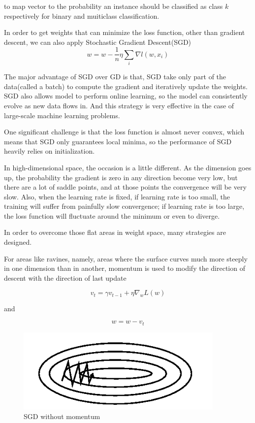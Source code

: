 \documentclass[10pt,twocolumn,letterpaper]{article}
\begin{document}
	to map vector to the probability an instance should be classified as class $k$ respectively for binary and muiticlass classification.
	
	In order to get weights that can minimize the loss function, other than gradient descent, we can also apply Stochastic Gradient Descent(SGD) 
	\[w = w - \frac{1}{n}\eta \sum_i \nabla l(w, x_i)\]
	
	The major advantage of SGD over GD is that, SGD take only part of the data(called a batch) to compute the gradient and iteratively update the weights. SGD also allows model to perform online learning, so the model can consistently evolve as new data flows in.\cite{alpaydin2004introduction} And this strategy is very effective in the case of large-scale machine learning problems\cite{bottou-bousquet-2008}.
	
	One significant challenge is that the loss function is almost never convex\cite{NIPS2016_6112}, which means that SGD only guarantees local minima, so the performance of SGD heavily relies on initialization.
	
	In high-dimensional space, the occasion is a little different. As the dimension goes up, the probability the gradient is zero in any direction become very low, but there are a lot of saddle points\cite{NIPS2016_6112}, and at those points the convergence will be very slow. Also, when the learning rate is fixed, if learning rate is too small, the training will suffer from painfully slow convergence; if learning rate is too large, the loss function will fluctuate around the minimum or even to diverge\cite{ruder_2017}.
	
	In order to overcome those flat areas in weight space, many strategies are designed.
	
	For areas like ravines, namely, areas where the surface curves much more steeply in one dimension than in another\cite{sutton:problems}, momentum is used to modify the direction of descent with the direction of last update
	
	\[v_t = \gamma v_{t - 1} + \eta \nabla_w L(w)\]
	
	and
	
	\[w = w - v_t\]
	
	\begin{figure}[h]
		\begin{center}
			\includegraphics[width=0.9\linewidth]{images/without.png}
			\caption{SGD without momentum}	
		\end{center}
	\end{figure}
	
\end{document}
